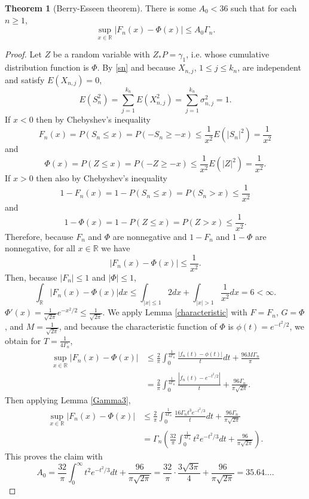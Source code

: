 \documentclass{article}
\theoremstyle{definition}
\newtheorem{theorem}{Theorem}
\theoremstyle{definition}
\begin{document}
\begin{theorem}[Berry-Esseen theorem]
There is some  $A_0<36$ such that for each $n \geq 1$,
\[
\sup_{x \in \mathbb{R}} |F_n(x) - \Phi(x)| \leq A_0 \Gamma_n.
\]
\end{theorem}
\begin{proof}
Let $Z$ be a random variable with $Z_*P=\gamma_1$, i.e.
whose cumulative distribution function is $\Phi$.  
By \eqref{sn} and because $X_{n,j}$, $1 \leq j \leq k_n$, are independent and satisfy $E(X_{n,j})=0$,
\[
E(S_n^2) = \sum_{j=1}^{k_n} E(X_{n,j}^2) = \sum_{j=1}^{k_n} \sigma_{n,j}^2 = 1.
\]
If $x<0$ then  by Chebyshev's inequality 
\[
F_n(x) = P(S_n \leq x) = P(-S_n \geq -x) \leq \frac{1}{x^2} E(|S_n|^2)
=\frac{1}{x^2}
\]
and 
\[
\Phi(x) = P(Z \leq x) = P(-Z \geq -x) \leq \frac{1}{x^2} E(|Z|^2) =\frac{1}{x^2}.
\]
If $x > 0$ then also by Chebyshev's inequality
\[
1-F_n(x) = 1-P(S_n \leq x) = P(S_n > x) \leq \frac{1}{x^2}
\]
and
\[
1-\Phi(x) = 1-P(Z \leq x) = P(Z>x) \leq \frac{1}{x^2}.
\]
Therefore, because $F_n$ and $\Phi$ are nonnegative and $1-F_n$ and $1-\Phi$ are nonnegative, for all $x \in \mathbb{R}$ we have
\[
|F_n(x)-\Phi(x)| \leq \frac{1}{x^2}.
\]
Then, because $|F_n| \leq 1$ and $|\Phi| \leq 1$,
\[
\int_\mathbb{R} |F_n(x)-\Phi(x)| dx \leq 
\int_{|x| \leq 1} 2 dx + \int_{|x|>1} \frac{1}{x^2} dx
=6<\infty.
\]
$\Phi'(x) = \frac{1}{\sqrt{2\pi}} e^{-x^2/2} \leq \frac{1}{\sqrt{2\pi}}$. 
We apply Lemma \ref{characteristic} with $F=F_n$, $G=\Phi$, and $M=\frac{1}{\sqrt{2\pi}}$, and because
the characteristic function of $\Phi$ is $\phi(t)=e^{-t^2/2}$, we
obtain
for $T=\frac{1}{4\Gamma_n}$,
\begin{align*}
\sup_{x \in \mathbb{R}} |F_n(x)-\Phi(x)|&\leq \frac{2}{\pi} \int_0^{\frac{1}{4\Gamma_n}} 
\frac{|f_n(t)-\phi(t)|}{t} dt + \frac{96M \Gamma_n}{\pi}\\
&=\frac{2}{\pi} \int_0^{\frac{1}{4\Gamma_n}} \frac{|f_n(t)-e^{-t^2/2}|}{t} + \frac{96 \Gamma_n}{\pi \sqrt{2\pi}}.
\end{align*}
Then applying Lemma \ref{Gamma3},
\begin{align*}
\sup_{x \in \mathbb{R}} |F_n(x)-\Phi(x)|&\leq \frac{2}{\pi} \int_0^{\frac{1}{4\Gamma_n}} \frac{16\Gamma_n t^3
e^{-t^2/3}}{t} dt+ \frac{96 \Gamma_n}{\pi \sqrt{2\pi}}\\
&=\Gamma_n\left( \frac{32}{\pi} \int_0^{\frac{1}{4\Gamma_n}} t^2 e^{-t^2/3} dt + \frac{96}{\pi\sqrt{2\pi}}\right).
\end{align*}
This proves the claim with
\[
A_0 =  \frac{32}{\pi} \int_0^{\infty} t^2 e^{-t^2/3} dt + \frac{96}{\pi\sqrt{2\pi}} 
=\frac{32}{\pi} \cdot \frac{3\sqrt{3\pi}}{4} + \frac{96}{\pi\sqrt{2\pi}}
=35.64\ldots.
\]
\end{proof}
\end{document}
